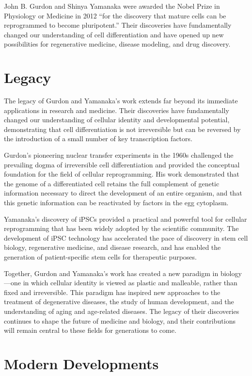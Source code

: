 John B. Gurdon and Shinya Yamanaka were awarded the Nobel Prize in Physiology or Medicine in 2012 ``for the discovery that mature cells can be reprogrammed to become pluripotent.'' Their discoveries have fundamentally changed our understanding of cell differentiation and have opened up new possibilities for regenerative medicine, disease modeling, and drug discovery.

\section{Legacy}

The legacy of Gurdon and Yamanaka's work extends far beyond its immediate applications in research and medicine. Their discoveries have fundamentally changed our understanding of cellular identity and developmental potential, demonstrating that cell differentiation is not irreversible but can be reversed by the introduction of a small number of key transcription factors.

Gurdon's pioneering nuclear transfer experiments in the 1960s challenged the prevailing dogma of irreversible cell differentiation and provided the conceptual foundation for the field of cellular reprogramming. His work demonstrated that the genome of a differentiated cell retains the full complement of genetic information necessary to direct the development of an entire organism, and that this genetic information can be reactivated by factors in the egg cytoplasm.

Yamanaka's discovery of iPSCs provided a practical and powerful tool for cellular reprogramming that has been widely adopted by the scientific community. The development of iPSC technology has accelerated the pace of discovery in stem cell biology, regenerative medicine, and disease research, and has enabled the generation of patient-specific stem cells for therapeutic purposes.

Together, Gurdon and Yamanaka's work has created a new paradigm in biology---one in which cellular identity is viewed as plastic and malleable, rather than fixed and irreversible. This paradigm has inspired new approaches to the treatment of degenerative diseases, the study of human development, and the understanding of aging and age-related diseases. The legacy of their discoveries continues to shape the future of medicine and biology, and their contributions will remain central to these fields for generations to come.


\section{Modern Developments}

